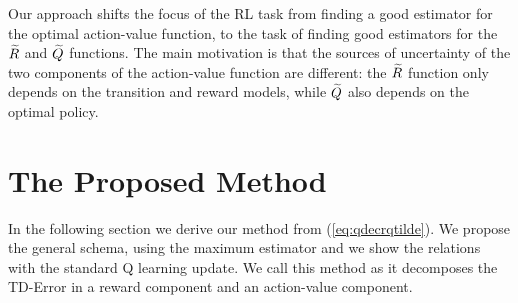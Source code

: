 \documentclass[conference]{IEEEtran}
\begin{document}
Our approach shifts the focus of the RL task from finding a good estimator for the optimal action-value function, to the task of finding good estimators for the $\widetilde{R}$ and $\widetilde{Q}$ functions. The main motivation is that the sources of uncertainty of the two components of the action-value function are different: the $\widetilde{R}$ function only depends on the transition and reward models, while $\widetilde{Q}$ also depends on the optimal policy.
\section{The Proposed Method}
In the following section we derive our method from (\ref{eq:qdecrqtilde}). We propose the general schema, using the maximum estimator and we show the relations with the standard Q learning update. We call this method \emph{\alg} as it decomposes the TD-Error in a reward component and an action-value component.
\end{document}
